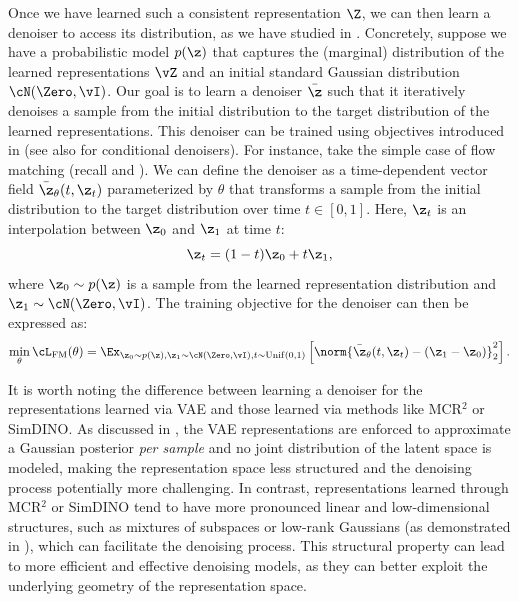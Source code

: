 \documentclass[../../book-main.tex]{subfiles}
\begin{document}
Once we have learned such a consistent representation $\Z$, we can then learn
a denoiser to access its distribution, as we have studied in
. Concretely, suppose we have a probabilistic model $p(\z)$
that captures the (marginal) distribution of the learned
representations $\vZ$ and an
initial standard Gaussian distribution $\cN(\Zero, \vI)$. Our goal is to learn
a denoiser $\bar{\z}$ such that it iteratively denoises a sample from the
initial distribution to the target distribution of the learned representations.
This denoiser can be trained using objectives introduced in 
(see also  for conditional denoisers). For
instance, take the simple case of flow matching (recall
     and
). We can define the denoiser as a
time-dependent vector field $\bar{\z}_{\theta}(t, \z_t)$
parameterized by $\theta$ that transforms a sample from the initial
distribution to the target distribution over time $t \in [0, 1]$.
Here, $\z_t$ is an interpolation between $\z_0$ and $\z_1$ at time $t$:
\begin{equation}
    \z_t = (1 - t)\z_0 + t\z_1,
\end{equation}
where $\z_0 \sim p(\z)$ is a sample from the learned representation distribution
and $\z_1 \sim \cN(\Zero, \vI)$.
The training objective for the denoiser can then be expressed as:
\begin{equation}
    \min_{\theta} \cL_{\mathrm{FM}}(\theta) = \Ex_{\z_0 \sim p(\z), \z_1 \sim
    \cN(\Zero, \vI), t \sim \mathrm{Unif}(0, 1)} \left[
    \norm{\bar{\z}_{\theta}(t,\z_t) - (\z_1 - \z_0)}_2^2 \right].
\end{equation}


It is worth noting the difference between learning a denoiser for the
representations learned via VAE and those learned via methods like MCR$^2$ or
SimDINO. As discussed in , the VAE representations are
enforced to approximate a Gaussian posterior \textit{per sample} and
no joint distribution of the latent space is modeled, making the
representation space less structured and the denoising process
potentially more challenging. In contrast, representations learned
through MCR$^2$ or SimDINO tend to have more pronounced linear and
low-dimensional structures, such as mixtures of subspaces or low-rank
Gaussians (as demonstrated in ), which can
facilitate the denoising process. This structural property can lead
to more efficient and effective denoising models, as they can better
exploit the underlying geometry of the representation space.
\end{document}
